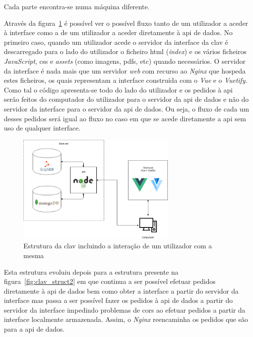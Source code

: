 Cada parte encontra-se numa máquina diferente.

Através da figura~\ref{fig:clav_struct} é possível ver o possível fluxo tanto de um utilizador a aceder à interface como a de um utilizador a aceder diretamente à \acrshort{api} de dados. No primeiro caso, quando um utilizador acede o servidor da interface da \acrshort{clav} é descarregado para o lado do utilizador o ficheiro \acrshort{html} (\textit{index}) e os vários ficheiros \textit{JavaScript}, \acrshort{css} e \textit{assets} (como imagens, \acrshort{pdf}s, etc) quando necessários. O servidor da interface é nada mais que um servidor \textit{web} com recurso ao \textit{Nginx} que hospeda estes ficheiros, os quais representam a interface construída com o \textit{Vue} e o \textit{Vuetify}. Como tal o código apresenta-se todo do lado do utilizador e os pedidos à \acrshort{api} serão feitos do computador do utilizador para o servidor da \acrshort{api} de dados e não do servidor da interface para o servidor da \acrshort{api} de dados. Ou seja, o fluxo de cada um desses pedidos será igual ao fluxo no caso em que se acede diretamente a \acrshort{api} sem uso de qualquer interface.

\begin{figure}[H]
    \begin{center}
        \includegraphics[width=0.7\textwidth]{img/clav_struct.png}
    \end{center}
    \caption{Estrutura da \acrshort{clav} incluindo a interação de um utilizador com a mesma}\label{fig:clav_struct}
\end{figure}

Esta estrutura evoluiu depois para a estrutura presente na figura~\ref{fig:clav_struct2} em que continua a ser possível efetuar pedidos diretamente à \acrshort{api} de dados bem como obter a interface a partir do servidor da interface mas passa a ser possível fazer os pedidos à \acrshort{api} de dados a partir do servidor da interface impedindo problemas de \acrshort{cors} ao efetuar pedidos a partir da interface localmente armazenada. Assim, o \textit{Nginx} reencaminha os pedidos que são para a \acrshort{api} de dados.

